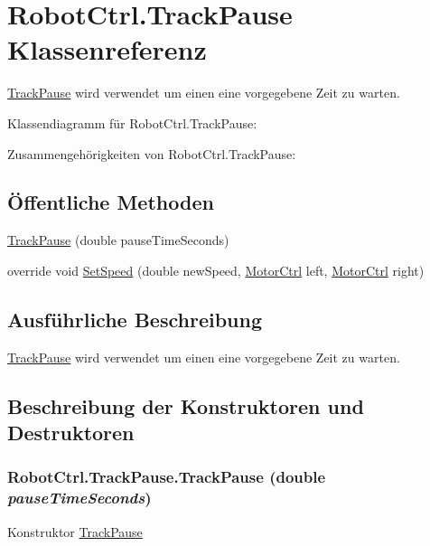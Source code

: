 \hypertarget{class_robot_ctrl_1_1_track_pause}{
\section{RobotCtrl.TrackPause Klassenreferenz}
\label{class_robot_ctrl_1_1_track_pause}
}


\hyperlink{class_robot_ctrl_1_1_track_pause}{TrackPause} wird verwendet um einen eine vorgegebene Zeit zu warten.  




Klassendiagramm für RobotCtrl.TrackPause:

Zusammengehörigkeiten von RobotCtrl.TrackPause:\subsection*{Öffentliche Methoden}
\begin{DoxyCompactItemize}
\item 
\hyperlink{class_robot_ctrl_1_1_track_pause_ab869a1e5eb8a5db402ad7a7515700688}{TrackPause} (double pauseTimeSeconds)
\item 
override void \hyperlink{class_robot_ctrl_1_1_track_pause_a47133c69e455aa2c04f1bc3a6b5999b6}{SetSpeed} (double newSpeed, \hyperlink{class_robot_ctrl_1_1_motor_ctrl}{MotorCtrl} left, \hyperlink{class_robot_ctrl_1_1_motor_ctrl}{MotorCtrl} right)
\end{DoxyCompactItemize}


\subsection{Ausführliche Beschreibung}
\hyperlink{class_robot_ctrl_1_1_track_pause}{TrackPause} wird verwendet um einen eine vorgegebene Zeit zu warten. 

\subsection{Beschreibung der Konstruktoren und Destruktoren}
\hypertarget{class_robot_ctrl_1_1_track_pause_ab869a1e5eb8a5db402ad7a7515700688}{
\subsubsection[{TrackPause}]{\setlength{\rightskip}{0pt plus 5cm}RobotCtrl.TrackPause.TrackPause (double {\em pauseTimeSeconds})}}
\label{class_robot_ctrl_1_1_track_pause_ab869a1e5eb8a5db402ad7a7515700688}
Konstruktor \hyperlink{class_robot_ctrl_1_1_track_pause}{TrackPause}


